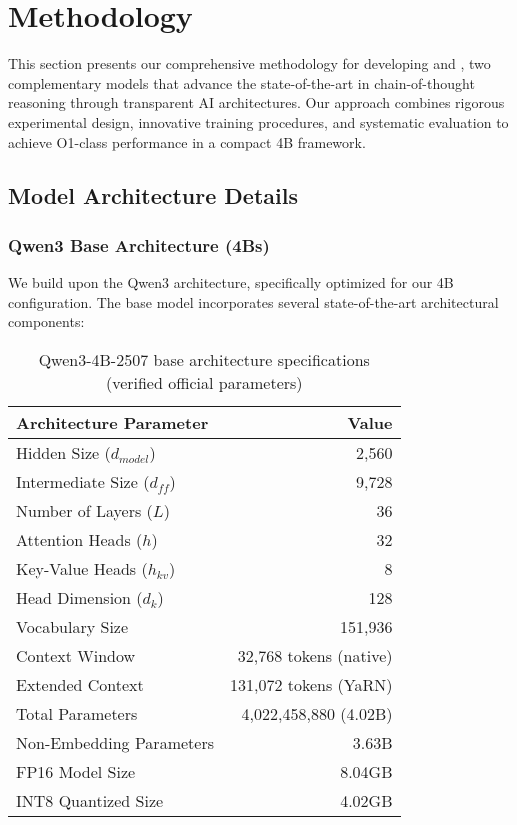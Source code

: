 \section{Methodology}
\label{sec:methodology}

This section presents our comprehensive methodology for developing \supra{} and \zennano{}, two complementary models that advance the state-of-the-art in chain-of-thought reasoning through transparent AI architectures. Our approach combines rigorous experimental design, innovative training procedures, and systematic evaluation to achieve O1-class performance in a compact 4B framework.

\subsection{Model Architecture Details}

\subsubsection{Qwen3 Base Architecture (4Bs)}
We build upon the Qwen3 architecture, specifically optimized for our 4B configuration. The base model incorporates several state-of-the-art architectural components:

\begin{table}[H]
\centering
\begin{tabular}{lr}
\toprule
Architecture Parameter & Value \\
\midrule
Hidden Size ($d_{model}$) & 2,560 \\
Intermediate Size ($d_{ff}$) & 9,728 \\
Number of Layers ($L$) & 36 \\
Attention Heads ($h$) & 32 \\
Key-Value Heads ($h_{kv}$) & 8 \\
Head Dimension ($d_k$) & 128 \\
Vocabulary Size & 151,936 \\
Context Window & 32,768 tokens (native) \\
Extended Context & 131,072 tokens (YaRN) \\
Total Parameters & 4,022,458,880 (4.02B) \\
Non-Embedding Parameters & 3.63B \\
FP16 Model Size & 8.04GB \\
INT8 Quantized Size & 4.02GB \\
\bottomrule
\end{tabular}
\caption{Qwen3-4B-2507 base architecture specifications (verified official parameters)}
\label{tab:qwen3-architecture}
\end{table}

